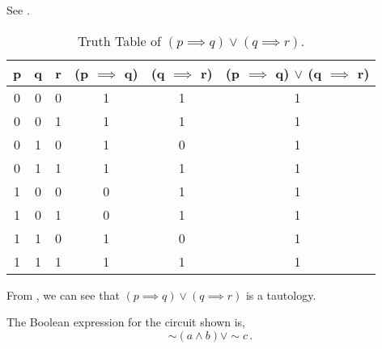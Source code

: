 \begin{subquestions}
\subquestion

\begin{subsubquestions}
	
\subsubquestion

See .
\begin{table}[ht]
	\centering
	\begin{tabular}{|c|c|c|c|c|c|}
		\hline
		p & q & r & (p $\implies$ q) & (q $\implies$ r) & (p $\implies$ q) $\lor$ (q $\implies$ r) \\
		\hline
		0 & 0 & 0 & 1 & 1 & 1 \\
		0 & 0 & 1 & 1 & 1 & 1 \\
		0 & 1 & 0 & 1 & 0 & 1 \\
		0 & 1 & 1 & 1 & 1 & 1 \\
		1 & 0 & 0 & 0 & 1 & 1 \\
		1 & 0 & 1 & 0 & 1 & 1 \\
		1 & 1 & 0 & 1 & 0 & 1 \\
		1 & 1 & 1 & 1 & 1 & 1 \\
		\hline
	\end{tabular}
	\caption{\label{2014:q1:tab:Tab2} Truth Table of $(p \implies q) \lor (q \implies r)$.}
\end{table}


\subsubquestion

From , we can see that $(p \implies q) \lor (q \implies r)$ is a tautology.
\end{subsubquestions}


\subquestion

The Boolean expression for the circuit shown is,
\begin{equation}
	\sim (a \land b) \lor \sim c\,.
\end{equation}


\subquestion


\end{subquestions}
